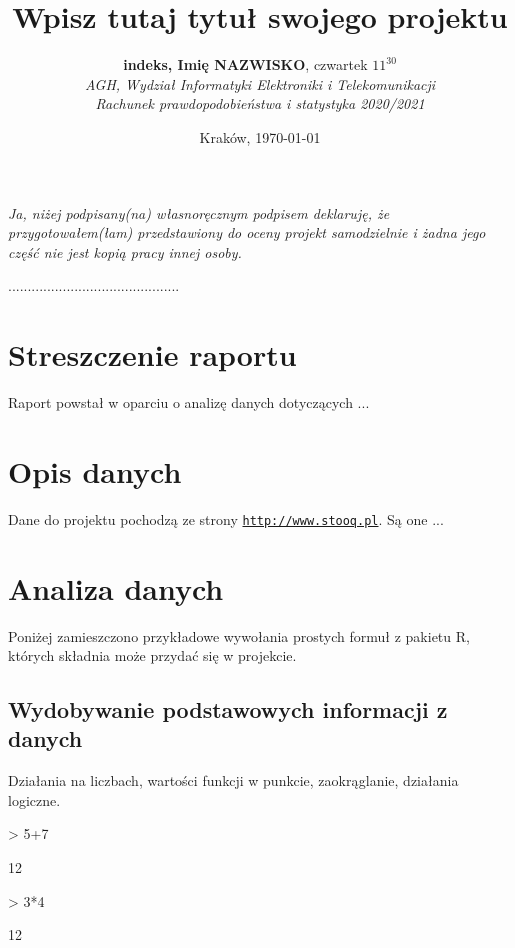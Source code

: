 \documentclass{article}
\title{Wpisz tutaj tytuł swojego projektu}
\author{\textbf{indeks, Imię NAZWISKO}, czwartek $11^{30}$\\ 
\textit{AGH, Wydział Informatyki Elektroniki i Telekomunikacji}\\
\textit{Rachunek prawdopodobieństwa i statystyka 2020/2021}}
\date{Kraków, \today}
\begin{document}

\maketitle

\textit{Ja, niżej podpisany(na) własnoręcznym podpisem deklaruję, że przygotowałem(łam) przedstawiony do oceny projekt samodzielnie i żadna jego część nie jest kopią pracy innej osoby.}
\begin{flushright}
{............................................}
\end{flushright}

\section{Streszczenie raportu}
Raport powstał w oparciu o analizę danych dotyczących ...

\section{Opis danych}
Dane do projektu pochodzą ze strony \href{url}{\texttt{http://www.stooq.pl}}. Są one ...

\section{Analiza danych}
Poniżej zamieszczono przykładowe wywołania prostych formuł z pakietu R, których składnia może przydać się w projekcie.
\subsection{Wydobywanie podstawowych informacji z danych}
Działania na liczbach, wartości funkcji w punkcie, zaokrąglanie, działania logiczne.
\begin{Schunk}
\begin{Sinput}
> 5+7
\end{Sinput}
\begin{Soutput}
[1] 12
\end{Soutput}
\begin{Sinput}
> 3*4
\end{Sinput}
\begin{Soutput}
[1] 12
\end{Soutput}
\end{Schunk}
\end{document}
